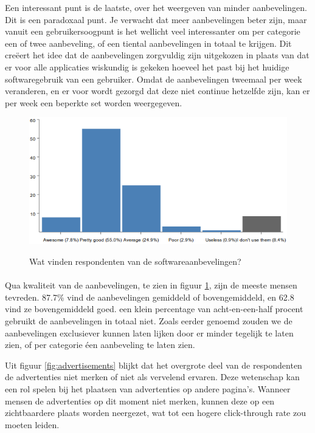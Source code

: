 \documentclass[a4paper, 10pt, pdftex]{report}
\begin{document}
      Een interessant punt is de laatste, over het weergeven van minder aanbevelingen. Dit is een paradoxaal punt. Je verwacht dat meer aanbevelingen beter zijn, maar vanuit een gebruikersoogpunt is het wellicht veel interessanter om per categorie een of twee aanbeveling, of een tiental aanbevelingen in totaal te krijgen. Dit creëert het idee dat de aanbevelingen zorgvuldig zijn uitgekozen in plaats van dat er voor alle applicaties wiskundig is gekeken hoeveel het past bij het huidige softwaregebruik van een gebruiker. Omdat de aanbevelingen tweemaal per week veranderen, en er voor wordt gezorgd dat deze niet continue hetzelfde zijn, kan er per week een beperkte set worden weergegeven.

        \begin{figure}
          \begin{center}
          \caption{Wat vinden respondenten van de softwareaanbevelingen?}
            \includegraphics[width=\textwidth]{../images/enquete/think-of-recommendations}
          \label{fig:recommendations}
          \end{center}
        \end{figure}

      \paragraph{}Qua kwaliteit van de aanbevelingen, te zien in figuur \ref{fig:recommendations}, zijn de meeste mensen tevreden. 87.7\% vind de aanbevelingen gemiddeld of bovengemiddeld, en 62.8 vind ze bovengemiddeld goed. een klein percentage van acht-en-een-half procent gebruikt de aanbevelingen in totaal niet. Zoals eerder genoemd zouden we de aanbevelingen exclusiever kunnen laten lijken door er minder tegelijk te laten zien, of per categorie éen aanbeveling te laten zien.

      Uit figuur \ref{fig:advertisements} blijkt dat het overgrote deel van de respondenten de advertenties niet merken of niet als vervelend ervaren. Deze wetenschap kan een rol spelen bij het plaatsen van advertenties op andere pagina's. Wanneer mensen de advertenties op dit moment niet merken, kunnen deze op een zichtbaardere plaats worden neergezet, wat tot een hogere click-through rate zou moeten leiden.
\end{document}
